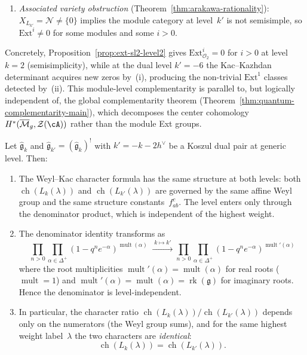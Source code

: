 \begin{proposition}
\begin{enumerate}[label=\textup{(\roman*)}]
\item \emph{Associated variety obstruction}
  (Theorem~\ref{thm:arakawa-rationality}):
  $X_{L_{k'}} = \mathcal{N} \neq \{0\}$ implies the module category
  at level~$k'$ is not semisimple, so $\mathrm{Ext}^i \neq 0$ for
  some modules and some $i > 0$.
\end{enumerate}

Concretely, Proposition~\ref{prop:ext-sl2-level2} gives
$\mathrm{Ext}^i_{\mathcal{O}_2} = 0$ for $i > 0$ at level $k = 2$
(semisimplicity), while at the dual level $k' = -6$ the Kac--Kazhdan
determinant acquires new zeros by~(i), producing the non-trivial
$\mathrm{Ext}^1$ classes detected by~(ii).  This module-level
complementarity is parallel to, but logically independent of,
the global complementarity theorem
(Theorem~\ref{thm:quantum-complementarity-main}), which decomposes
the center cohomology $H^*(\overline{\mathcal{M}}_g, \mathcal{Z}(\cA))$
rather than the module Ext groups.
\end{proposition}

\begin{proposition}
\label{prop:character-koszul-duality}
Let $\widehat{\mathfrak{g}}_k$ and
$\widehat{\mathfrak{g}}_{k'} = (\widehat{\mathfrak{g}}_k)^!$ with
$k' = -k - 2h^\vee$ be a Koszul dual pair at generic level.  Then:
\begin{enumerate}[label=\textup{(\roman*)}]
\item The Weyl--Kac character formula has the same structure at both
  levels: both $\operatorname{ch}(L_k(\lambda))$ and
  $\operatorname{ch}(L_{k'}(\lambda))$ are governed by the same
  affine Weyl group and the same structure constants~$f_{ab}^c$.
  The level enters only through the denominator product, which is
  independent of the highest weight.
\item The denominator identity transforms as
  \[
  \prod_{n > 0} \prod_{\alpha \in \Delta^+}
  (1 - q^n e^{-\alpha})^{\operatorname{mult}(\alpha)}
  \;\xrightarrow{\;k \mapsto k'\;}
  \prod_{n > 0} \prod_{\alpha \in \Delta^+}
  (1 - q^n e^{-\alpha})^{\operatorname{mult}'(\alpha)}
  \]
  where the root multiplicities $\operatorname{mult}'(\alpha) =
  \operatorname{mult}(\alpha)$ for real roots
  \textup{(}$\operatorname{mult} = 1$\textup{)} and
  $\operatorname{mult}'(\alpha) = \operatorname{mult}(\alpha) =
  \operatorname{rk}(\mathfrak{g})$ for imaginary roots.
  Hence the denominator is level-independent.
\item In particular, the character ratio
  $\operatorname{ch}(L_k(\lambda)) /
  \operatorname{ch}(L_{k'}(\lambda))$ depends only on the
  numerators \textup{(}the Weyl group sums\textup{)}, and for the same
  highest weight label~$\lambda$ the two characters are
  \emph{identical}:
  \[
  \operatorname{ch}(L_k(\lambda))
  = \operatorname{ch}(L_{k'}(\lambda)).
  \]
\end{enumerate}
\end{proposition}

